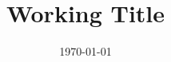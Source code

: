 \documentclass[12pt]{article}
\begin{document}
 
\title{Working Title} 


\date{\today} 
\maketitle








\end{document}

